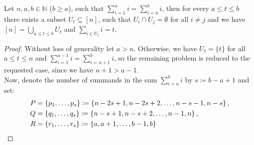 \begin{thm}\label{theorem11}
Let \(n,a,b\in\mathbb{N}\) (\(b\geq a\)), such that \(\sum\limits_{i=1}^ni=\sum\limits_{i=a}^bi\), then for every \(a\leq t\leq b\) there exists a subset \(U_t\subseteq [n]\), such that \(U_i\cap U_j=\emptyset\) for all \(i\neq j\) and we have\\
\([n]=\bigcup\limits_{a\leq t\leq b}U_t\) and \(\sum\limits_{i\in U_t}i=t\).
\begin{proof}
Without loss of generality let \(a>n\). Otherwise, we have \(U_t=\{t\}\) for all \(a\leq t\leq n\) and \(\sum\limits_{i=1}^{a-1}i=\sum\limits_{i=n+1}^bi\), so the remaining problem is reduced to the requested case, since we have \(n+1>a-1\).\\
Now, denote the number of summands in the sum \(\sum\limits_{i=a}^bi\) by \(s\coloneqq b-a+1\) and set:
\begin{align}
P&=\left\{p_1,\ldots,p_s\right\}\coloneqq \left\{n-2s+1,n-2s+2,\ldots,n-s-1,n-s\right\},\notag\\
Q&=\left\{q_1,\ldots,q_s\right\}\coloneqq \left\{n-s+1,n-s+2,\ldots,n-1,n\right\},\notag\\
R&=\left\{r_1,\ldots,r_s\right\}\coloneqq \left\{a,a+1,\ldots,b-1,b\right\}\notag
\end{align}

\end{proof}
\end{thm}
